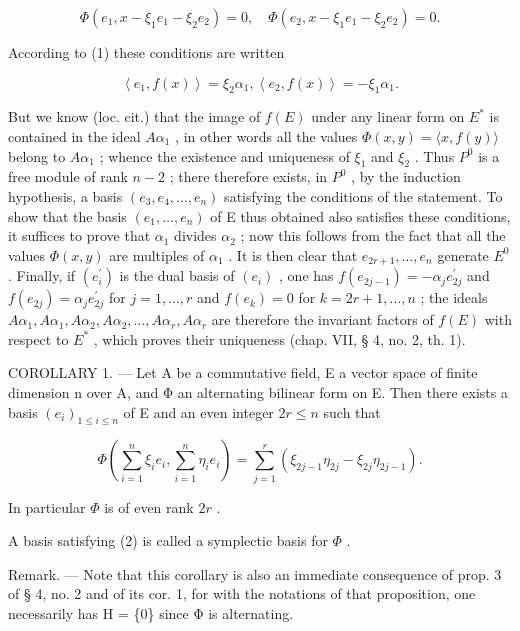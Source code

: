 \[
\Phi (e _ {1}, x - \xi_ {1} e _ {1} - \xi_ {2} e _ {2}) = 0, \quad \Phi (e _ {2}, x - \xi_ {1} e _ {1} - \xi_ {2} e _ {2}) = 0.
\]

According to (1) these conditions are written

\[
\left\langle e _ {1}, f (x) \right\rangle = \xi_ {2} \alpha_ {1}, \left\langle e _ {2}, f (x) \right\rangle = - \xi_ {1} \alpha_ {1}.
\]

But we know (loc. cit.) that the image of \(f(E)\) under any linear form on \(E^{*}\) is contained in the ideal \(A\alpha_{1}\) , in other words all the values \(\Phi(x,y)=\langle x,f(y)\rangle\) belong to \(A\alpha_{1}\) ; whence the existence and uniqueness of \(\xi_{1}\) and \(\xi_{2}\) . Thus \(P^{0}\) is a free module of rank \(n-2\) ; there therefore exists, in \(P^{0}\) , by the induction hypothesis, a basis \((e_{3},e_{4},\ldots,e_{n})\) satisfying the conditions of the statement. To show that the basis \((e_{1},\ldots,e_{n})\) of E thus obtained also satisfies these conditions, it suffices to prove that \(\alpha_{1}\) divides \(\alpha_{2}\) ; now this follows from the fact that all the values \(\Phi(x,y)\) are multiples of \(\alpha_{1}\) . It is then clear that \(e_{2r+1},\ldots,e_{n}\) generate \(E^{0}\) . Finally, if \((e_{i}^{\prime})\) is the dual basis of \((e_{i})\) , one has \(f(e_{2j-1})=-\alpha_{j}e_{2j}^{\prime}\) and \(f(e_{2j})=\alpha_{j}e_{2j}^{\prime}\) for \(j=1,\ldots,r\) and \(f(e_{k})=0\) for \(k=2r+1,\ldots,n\) ; the ideals \(A\alpha_{1},A\alpha_{1},A\alpha_{2},A\alpha_{2},\ldots,A\alpha_{r},A\alpha_{r}\) are therefore the invariant factors of \(f(E)\) with respect to \(E^{*}\) , which proves their uniqueness (chap. VII, § 4, no. 2, th. 1).

COROLLARY 1. --- Let A be a commutative field, E a vector space of finite dimension n over A, and Φ an alternating bilinear form on E. Then there exists a basis \((e_i)_{1\leqslant i\leqslant n}\) of E and an even integer \(2r\leqslant n\) such that

\[
\Phi (\sum_ {i = 1} ^ {n} \xi_ {i} e _ {i}, \sum_ {i = 1} ^ {n} \eta_ {i} e _ {i}) = \sum_ {j = 1} ^ {r} (\xi_ {2 j - 1} \eta_ {2 j} - \xi_ {2 j} \eta_ {2 j - 1}).\tag{2}
\]

In particular \(\Phi\) is of even rank \(2r\) .

A basis satisfying (2) is called a symplectic basis for \(\Phi\) .

Remark. --- Note that this corollary is also an immediate consequence of prop. 3 of § 4, no. 2 and of its cor. 1, for with the notations of that proposition, one necessarily has H = \{0\} since Φ is alternating.

